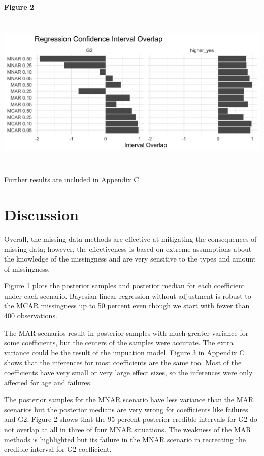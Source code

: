 \documentclass[11pt]{article}
\begin{document}
\textbf{Figure 2}

\includegraphics[width=6.5in, height=3in]{credible-interval-overlap-1}

Further results are included in Appendix C. 

\section{Discussion}

Overall, the missing data methods are effective at mitigating the consequences of missing data; however, the effectiveness is based on extreme assumptions about the knowledge of the missingness and are very sensitive to the types and amount of missingness. 

Figure 1 plots the posterior samples and posterior median for each coefficient under each scenario. Bayesian linear regression without adjustment is robust to the MCAR missingness up to 50 percent even though we start with fewer than 400 observations. 

The MAR scenarios result in posterior samples with much greater variance for some coefficients, but the centers of the samples were accurate. The extra variance could be the result of the impuation model. Figure 3 in Appendix C shows that the inferences for most coefficients are the same too. Most of the coefficients have very small or very large effect sizes, so the inferences were only affected for age and failures.

The posterior samples for the MNAR scenario have less variance than the MAR scenarios but the posterior medians are very wrong for coefficients like failures and G2. Figure 2 shows that the 95 percent posterior credible intervals for G2 do not overlap at all in three of four MNAR situations. The weakness of the MAR methods is highlighted but its failure in the MNAR scenario in recreating the credible interval for G2 coefficient.  
\end{document}

